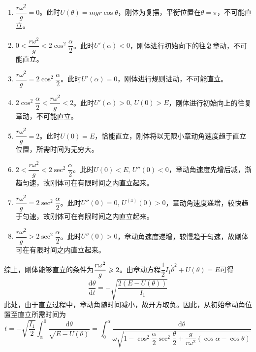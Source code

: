 \begin{solution}
\begin{enumerate}
	\item $\dfrac{r\omega^2}{g} = 0$。此时$U(\theta) = mgr\cos \theta$，刚体为复摆，平衡位置在$\theta = \pi$，不可能直立。
	\item $0 < \dfrac{r\omega^2}{g} < 2\cos^2 \dfrac{\alpha}{2}$。此时$U'(\alpha)<0$，刚体进行初始向下的往复章动，不可能直立。
	\item $\dfrac{r\omega^2}{g} = 2\cos^2 \dfrac{\alpha}{2}$。此时$U'(\alpha) = 0$，刚体进行规则进动，不可能直立。
	\item $2\cos^2 \dfrac{\alpha}{2} < \dfrac{r\omega^2}{g} < 2$。此时$U'(\alpha) > 0,\,U(0) > E$，刚体进行初始向上的往复章动，不可能直立。
	\item $\dfrac{r\omega^2}{g} = 2$。此时$U(0) = E$，恰能直立，刚体将以无限小章动角速度趋于直立位置，所需时间为无穷大。
	\item $2 < \dfrac{r\omega^2}{g} < 2\sec^2 \dfrac{\alpha}{2}$。此时$U(0)<E,\,U''(0)<0$，章动角速度先增后减，渐趋匀速，故刚体可在有限时间之内直立起来。
	\item $\dfrac{r\omega^2}{g} = 2\sec^2 \dfrac{\alpha}{2}$。此时$U''(0) = 0,\,U^{(4)}(0) > 0$，章动角速度递增，较快趋于匀速，故刚体可在有限时间之内直立起来。
	\item $\dfrac{r\omega^2}{g} > 2\sec^2 \dfrac{\alpha}{2}$。此时$U''(0) > 0$，章动角速度递增，较慢趋于匀速，故刚体可在有限时间之内直立起来。
\end{enumerate}
综上，刚体能够直立的条件为$\displaystyle\frac{r\omega^2}{g} \geqslant 2$。由章动方程$\dfrac12 I_1 \dot{\theta}^2 + U(\theta) = E$可得
\begin{equation*}
	\frac{\mathrm{d} \theta}{\mathrm{d} t} = -\sqrt{\frac{2(E-U(\theta))}{I_1}}
\end{equation*}
此处，由于直立过程中，章动角随时间减小，故开方取负。因此，从初始章动角位置至直立所需时间为
\begin{equation*}
	t = -\sqrt{\frac{I_1}{2}} \int_\alpha^0 \frac{\mathrm{d} \theta}{\sqrt{E-U(\theta)}} = \int_0^\alpha \frac{\mathrm{d} \theta}{\omega\sqrt{1 - \cos^2 \dfrac{\alpha}{2} \sec^2 \dfrac{\theta}{2} + \dfrac{g}{r\omega^2}(\cos \alpha-\cos \theta)}}
\end{equation*}
\end{solution}